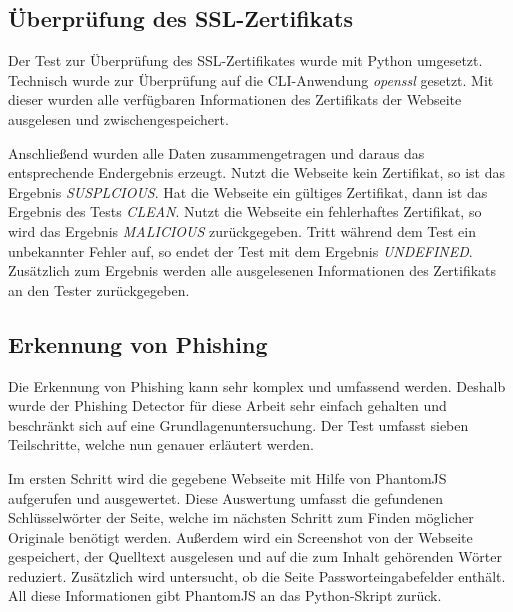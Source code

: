 \subsection{Überprüfung des SSL-Zertifikats}

Der Test zur Überprüfung des SSL-Zertifikates wurde mit Python umgesetzt. Technisch wurde zur Überprüfung auf die \ac{CLI}-Anwendung \textit{openssl} gesetzt. Mit dieser wurden alle verfügbaren Informationen des Zertifikats der Webseite ausgelesen und zwischengespeichert.

Anschließend wurden alle Daten zusammengetragen und daraus das entsprechende Endergebnis erzeugt. Nutzt die Webseite kein Zertifikat, so ist das Ergebnis \textit{SUSPLCIOUS}. Hat die Webseite ein gültiges Zertifikat, dann ist das Ergebnis des Tests \textit{CLEAN}. Nutzt die Webseite ein fehlerhaftes Zertifikat, so wird das Ergebnis \textit{MALICIOUS} zurückgegeben. Tritt während dem Test ein unbekannter Fehler auf, so endet der Test mit dem Ergebnis \textit{UNDEFINED}. Zusätzlich zum Ergebnis werden alle ausgelesenen Informationen des Zertifikats an den Tester zurückgegeben.

\subsection{Erkennung von Phishing}
\label{sec:umsetzung-phishungdetector}

Die Erkennung von Phishing kann sehr komplex und umfassend werden. Deshalb wurde der Phishing Detector für diese Arbeit sehr einfach gehalten und beschränkt sich auf eine Grundlagenuntersuchung. Der Test umfasst sieben Teilschritte, welche nun genauer erläutert werden.

Im ersten Schritt wird die gegebene Webseite mit Hilfe von PhantomJS aufgerufen und ausgewertet. Diese Auswertung umfasst die gefundenen Schlüsselwörter der Seite, welche im nächsten Schritt zum Finden möglicher Originale benötigt werden. Außerdem wird ein Screenshot von der Webseite gespeichert, der Quelltext ausgelesen und auf die zum Inhalt gehörenden Wörter reduziert. Zusätzlich wird untersucht, ob die Seite Passworteingabefelder enthält. All diese Informationen gibt PhantomJS an das Python-Skript zurück.

